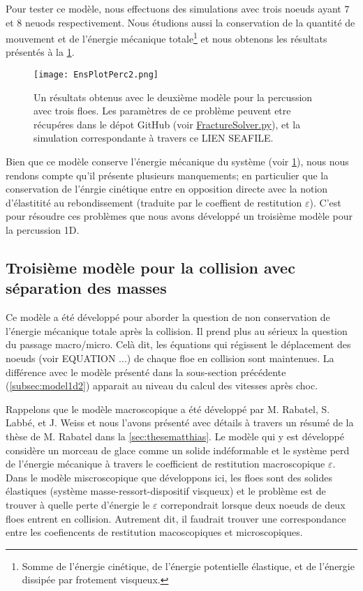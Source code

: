 Pour tester ce modèle, nous effectuons des simulations avec trois noeuds ayant $7$ et $8$ neuods respectivement. Nous étudions aussi la conservation de la quantité de mouvement et de l'énergie mécanique totale\footnote{Somme de l'énergie cinétique, de l'énergie potentielle élastique, et de l'énergie dissipée par frotement visqueux.} et nous obtenons les résultats présentés à la \cref{fig:frac1d4}.
\begin{figure}[!h]
    \centering
    \texttt{[image: EnsPlotPerc2.png]}
    \caption{Un résultats obtenus avec le deuxième modèle pour la percussion avec trois floes. Les paramètres de ce problème peuvent etre récupéres dans le dépot GitHub (voir \href{https://github.com/desmond-rn/ice-floes/blob/master/code/simu1D/FractureSolver.py}{FractureSolver.py}), et la simulation correspondante à travers ce LIEN SEAFILE.}
    \label{fig:frac1d4}
\end{figure}
Bien que ce modèle conserve l'énergie mécanique du système (voir \cref{fig:frac1d4}), nous nous rendons compte qu'il présente plusieurs manquements; en particulier que la conservation de l'énrgie cinétique entre en opposition directe avec la notion d'élastitité au rebondissement (traduite par le coeffient de restitution $\varepsilon$). C'est pour résoudre ces problèmes que nous avons développé un troisième modèle pour la percussion 1D.





\subsection{Troisième modèle pour la collision avec séparation des masses}
\label{subsubsec:troisiemecol}

Ce modèle a été développé pour aborder la question de non conservation de l'énergie mécanique totale après la collision.
Il prend plus au sérieux la question du passage macro/micro. Celà dit, les équations qui régissent le déplacement des noeuds (voir EQUATION ...) de chaque floe en collision sont maintenues. La différence avec le modèle présenté dans la sous-section précédente (\cref{subsec:model1d2}) apparait au niveau du calcul des vitesses après choc.

Rappelons que le modèle macroscopique a été développé par M. Rabatel, S. Labbé, et J. Weiss \parencite{rabatel2015dynamics} et nous l'avons présenté avec détails à travers un résumé de la thèse de M. Rabatel \parencite{rabatel2015thesis} dans la \cref{sec:thesematthias}. Le modèle qui y est développé considère un morceau de glace comme un solide indéformable et le système perd de l'énergie mécanique à travers le coefficient de restitution macroscopique $\varepsilon$. Dans le modèle miscroscopique que développons ici, les floes sont des solides élastiques (système masse-ressort-dispositif visqueux) et le problème est de trouver à quelle perte d'énergie le $\varepsilon$ correpondrait lorsque deux noeuds de deux floes entrent en collision. Autrement dit, il faudrait trouver une correspondance entre les coefiencents de restitution macoscopiques et microscopiques.

